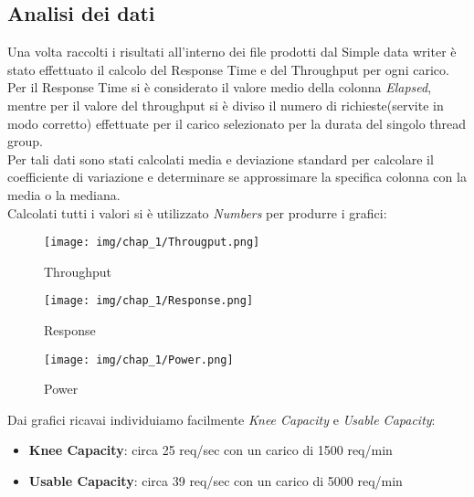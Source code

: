 \subsection{Analisi dei dati}
Una volta raccolti i risultati all'interno dei file prodotti dal Simple data writer è stato effettuato il calcolo del Response Time e del Throughput per ogni carico.\\
Per il Response Time si è considerato il valore medio della colonna \textit{Elapsed}, mentre per il valore del throughput si è diviso il numero di richieste(servite in modo corretto) effettuate per il carico selezionato per la durata del singolo thread group.\\
Per tali dati sono stati calcolati media e deviazione standard per calcolare il coefficiente di variazione e determinare se approssimare la specifica colonna con la media o la mediana.\\
Calcolati tutti i valori si è utilizzato \textit{Numbers} per produrre i grafici:
\begin{figure}[H]
    \centering
    \texttt{[image: img/chap\_1/Througput.png]}
    \caption{Throughput}
    \label{fig:thrugh}
\end{figure}
\begin{figure}[H]
    \centering
    \texttt{[image: img/chap\_1/Response.png]}
    \caption{Response}
    \label{fig:response}
\end{figure}
\begin{figure}[H]
    \centering
    \texttt{[image: img/chap\_1/Power.png]}
    \caption{Power}
    \label{fig:power}
\end{figure}
Dai grafici ricavai individuiamo facilmente \textit{Knee Capacity} e \textit{Usable Capacity}:
\begin{itemize}
    \item \textbf{Knee Capacity}: circa 25 req/sec con un carico di 1500 req/min
    \item \textbf{Usable Capacity}: circa 39 req/sec con un carico di 5000 req/min
\end{itemize}
